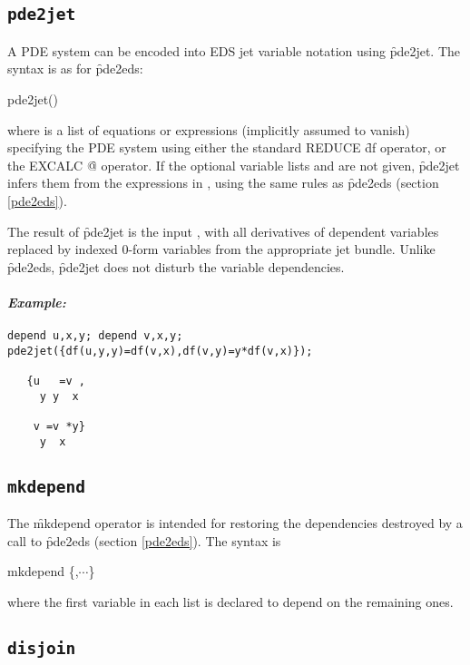 \subsection{\tt pde2jet}
\label{pde2jet}

A PDE system can be encoded into EDS jet variable notation using
\f{pde2jet}. The syntax is as for \f{pde2eds}:
\begin{syntax}
	pde2jet()
\end{syntax}
where  is a list of equations or expressions (implicitly assumed
to vanish) specifying the PDE system using either the standard REDUCE
\f{df} operator, or the EXCALC \f{@} operator. If the optional variable
lists  and  are not given, \f{pde2jet}
infers them from the expressions in , using the same rules as
\f{pde2eds} (section \ref{pde2eds}).

The result of \f{pde2jet} is the input , with all derivatives
of dependent variables replaced by indexed 0-form variables from the
appropriate jet bundle. Unlike \f{pde2eds}, \f{pde2jet} does not disturb
the variable dependencies.

\paragraph{\it Example:}
\begin{verbatim}
depend u,x,y; depend v,x,y;
pde2jet({df(u,y,y)=df(v,x),df(v,y)=y*df(v,x)});

   {u   =v ,
     y y  x

    v =v *y}
     y  x
\end{verbatim}


\subsection{\tt mkdepend}
\label{mkdepend}

The \f{mkdepend} operator is intended for restoring the dependencies
destroyed by a call to \f{pde2eds} (section \ref{pde2eds}). The syntax is
\begin{syntax}
	mkdepend \{,$\cdots$\}
\end{syntax}
where the first variable in each list is declared to depend on the
remaining ones.


\subsection{\tt disjoin}
\label{disjoin}

